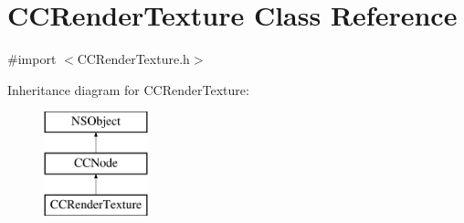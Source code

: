 \hypertarget{class_c_c_render_texture}{\section{C\-C\-Render\-Texture Class Reference}
\label{class_c_c_render_texture}
}


{\ttfamily \#import $<$C\-C\-Render\-Texture.\-h$>$}

Inheritance diagram for C\-C\-Render\-Texture\-:\begin{figure}[H]
\begin{center}
\leavevmode
\includegraphics[height=3.000000cm]{class_c_c_render_texture}
\end{center}
\end{figure}
